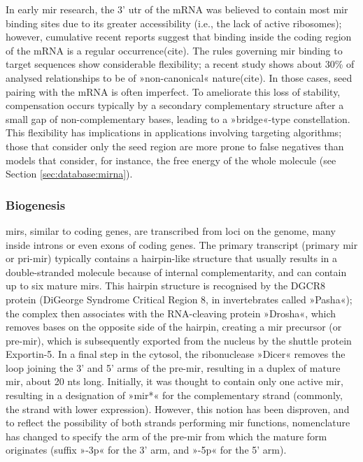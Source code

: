 In early \ac{mir} research, the 3' \ac{utr} of the mRNA was believed to contain most \ac{mir} binding sites due to its greater accessibility (i.e., the lack of active ribosomes); however, cumulative recent reports suggest that binding inside the coding region of the mRNA is a regular occurrence(cite). The rules governing \ac{mir} binding to target sequences show considerable flexibility; a recent study shows about 30\% of analysed relationships to be of »non-canonical« nature(cite). In those cases, seed pairing with the mRNA is often imperfect. To ameliorate this loss of stability, compensation occurs typically by a secondary complementary structure after a small gap of non-complementary bases, leading to a »bridge«-type constellation.  This flexibility has implications in applications involving targeting algorithms; those that consider only the seed region are more prone to false negatives than models that consider, for instance, the free energy of the whole molecule (see Section \ref{sec:database:mirna}).

\subsubsection{Biogenesis}
\acp{mir}, similar to coding genes, are transcribed from loci on the genome, many inside introns or even exons of coding genes\cite{Rodriguez2004}. The primary transcript (primary \ac{mir} or pri-\ac{mir}) typically contains a hairpin-like structure that usually results in a double-stranded molecule because of internal complementarity, and can contain up to six mature \acp{mir}. This hairpin structure is recognised by the DGCR8 protein (DiGeorge Syndrome Critical Region 8, in invertebrates called »Pasha«); the complex then associates with the RNA-cleaving protein »Drosha«, which removes bases on the opposite side of the hairpin, creating a \ac{mir} precursor (or pre-\ac{mir}), which is subsequently exported from the nucleus by the shuttle protein Exportin-5. In a final step in the cytosol, the ribonuclease »Dicer« removes the loop joining the 3' and 5' arms of the pre-\ac{mir}, resulting in a duplex of mature \ac{mir}, about 20 \acp{nt} long. Initially, it was thought to contain only one active \ac{mir}, resulting in a designation of »\ac{mir}*« for the complementary strand (commonly, the strand with lower expression). However, this notion has been disproven, and to reflect the possibility of both strands performing \ac{mir} functions, nomenclature has changed to specify the arm of the pre-\ac{mir} from which the mature form originates (suffix »-3p« for the 3' arm, and »-5p« for the 5' arm).

